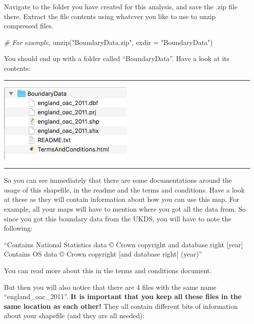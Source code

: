 \documentclass[
]{book}
\newenvironment{Shaded}{\begin{snugshade}}{\end{snugshade}}
\newcommand{\AttributeTok}[1]{\textcolor[rgb]{0.77,0.63,0.00}{#1}}
\newcommand{\CommentTok}[1]{\textcolor[rgb]{0.56,0.35,0.01}{\textit{#1}}}
\newcommand{\FunctionTok}[1]{\textcolor[rgb]{0.00,0.00,0.00}{#1}}
\newcommand{\NormalTok}[1]{#1}
\newcommand{\StringTok}[1]{\textcolor[rgb]{0.31,0.60,0.02}{#1}}
\begin{document}
Navigate to the folder you have created for this analysis, and save the .zip file there. Extract the file contents using whatever you like to use to unzip compressed files.

\begin{Shaded}
\begin{Highlighting}[]
\CommentTok{\# For example,}
\FunctionTok{unzip}\NormalTok{(}\StringTok{"BoundaryData.zip"}\NormalTok{, }\AttributeTok{exdir =} \StringTok{"BoundaryData"}\NormalTok{)}
\end{Highlighting}
\end{Shaded}

You should end up with a folder called ``BoundaryData''. Have a look at its contents:

\begin{center}\rule{0.5\linewidth}{0.5pt}\end{center}

\includegraphics{img/folder_contents.png}

\begin{center}\rule{0.5\linewidth}{0.5pt}\end{center}

So you can see immediately that there are some documentations around the usage of this shapefile, in the readme and the terms and conditions. Have a look at these as they will contain information about how you can use this map. For example, all your maps will have to mention where you got all the data from. So since you got this boundary data from the UKDS, you will have to note the following:

``Contains National Statistics data © Crown copyright and database right {[}year{]}
Contains OS data © Crown copyright {[}and database right{]} (year)''

You can read more about this in the terms and conditions document.

But then you will also notice that there are 4 files with the same name ``england\_oac\_2011''. \textbf{It is important that you keep all these files in the same location as each other!} They all contain different bits of information about your shapefile (and they are all needed):
\end{document}
